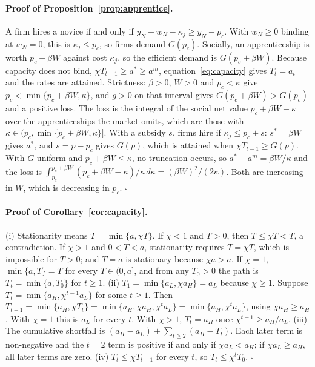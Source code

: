 \documentclass[12pt]{article}
\theoremstyle{remark}
\begin{document}
\paragraph{Proof of Proposition~\ref{prop:apprentice}.} A firm hires a novice if and only if $y_N-w_N-\kappa_j\ge y_N-p_c$. With $w_N\ge0$ binding at $w_N=0$, this is $\kappa_j\le p_c$, so firms demand $G(p_c)$. Socially, an apprenticeship is worth $p_c+\beta W$ against cost $\kappa_j$, so the efficient demand is $G(p_c+\beta W)$. Because capacity does not bind, $\chi T_{t-1}\ge a^*\ge a^m$, equation~\eqref{eq:capacity} gives $T_t=a_t$ and the rates are attained. Strictness: $\beta>0$, $W>0$ and $p_c<\bar\kappa$ give $p_c<\min\{p_c+\beta W,\bar\kappa\}$, and $g>0$ on that interval gives $G(p_c+\beta W)>G(p_c)$ and a positive loss. The loss is the integral of the social net value $p_c+\beta W-\kappa$ over the apprenticeships the market omits, which are those with $\kappa\in(p_c,\min\{p_c+\beta W,\bar\kappa\}]$. With a subsidy $s$, firms hire if $\kappa_j\le p_c+s$: $s^*=\beta W$ gives $a^*$, and $s=\bar p-p_c$ gives $G(\bar p)$, which is attained when $\chi T_{t-1}\ge G(\bar p)$. With $G$ uniform and $p_c+\beta W\le\bar\kappa$, no truncation occurs, so $a^*-a^m=\beta W/\bar\kappa$ and the loss is $\int_{p_c}^{p_c+\beta W}(p_c+\beta W-\kappa)/\bar\kappa\,d\kappa=(\beta W)^2/(2\bar\kappa)$. Both are increasing in $W$, which is decreasing in $p_c$. $\square$

\paragraph{Proof of Corollary~\ref{cor:capacity}.} (i) Stationarity means $T=\min\{a,\chi T\}$. If $\chi<1$ and $T>0$, then $T\le\chi T<T$, a contradiction. If $\chi>1$ and $0<T<a$, stationarity requires $T=\chi T$, which is impossible for $T>0$; and $T=a$ is stationary because $\chi a>a$. If $\chi=1$, $\min\{a,T\}=T$ for every $T\in(0,a]$, and from any $T_0>0$ the path is $T_t=\min\{a,T_0\}$ for $t\ge1$. (ii) $T_1=\min\{a_L,\chi a_H\}=a_L$ because $\chi\ge1$. Suppose $T_{t}=\min\{a_H,\chi^{t-1}a_L\}$ for some $t\ge1$. Then $T_{t+1}=\min\{a_H,\chi T_t\}=\min\{a_H,\chi a_H,\chi^{t}a_L\}=\min\{a_H,\chi^{t}a_L\}$, using $\chi a_H\ge a_H$. With $\chi=1$ this is $a_L$ for every $t$. With $\chi>1$, $T_t=a_H$ once $\chi^{t-1}\ge a_H/a_L$. (iii) The cumulative shortfall is $(a_H-a_L)+\sum_{t\ge2}(a_H-T_t)$. Each later term is non-negative and the $t=2$ term is positive if and only if $\chi a_L<a_H$; if $\chi a_L\ge a_H$, all later terms are zero. (iv) $T_t\le\chi T_{t-1}$ for every $t$, so $T_t\le\chi^tT_0$. $\square$
\end{document}
